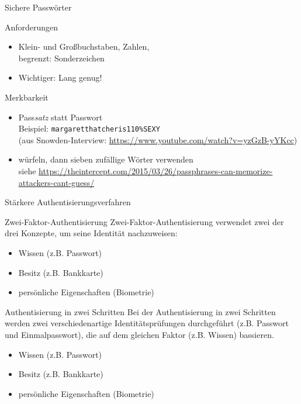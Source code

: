 \begin{frame}{Sichere Passwörter}
  \begin{block}{Anforderungen}
  \begin{itemize}
    \item Klein- und Großbuchstaben, Zahlen,\\ begrenzt: Sonderzeichen
    \item Wichtiger: Lang genug!
  \end{itemize}
  \end{block}
  \begin{block}{Merkbarkeit}
  \begin{itemize}
    \item Pass\emph{satz} statt Passwort\\
      Beispiel: \texttt{margaretthatcheris110\%SEXY}\\
      {\scriptsize (aus Snowden-Interview: \url{https://www.youtube.com/watch?v=yzGzB-yYKcc})}
    \item würfeln, dann sieben zufällige Wörter verwenden\\
      {\scriptsize siehe \url{https://theintercept.com/2015/03/26/passphrases-can-memorize-attackers-cant-guess/}}
  \end{itemize}
  \end{block}
\end{frame}

\begin{frame}{Stärkere Authentisierungsverfahren}
  \begin{block}{Zwei-Faktor-Authentisierung}
    Zwei-Faktor-Authentisierung verwendet zwei der drei Konzepte, um seine Identität nachzuweisen:
    \begin{itemize}
      \item Wissen (z.B. Passwort)
      \item Besitz (z.B. Bankkarte)
      \item persönliche Eigenschaften (Biometrie)
    \end{itemize}
  \end{block}
  \begin{block}{Authentisierung in zwei Schritten}
    Bei der Authentisierung in zwei Schritten werden zwei verschiedenartige Identitätsprüfungen durchgeführt (z.B. Passwort und Einmalpasswort),
    die auf dem gleichen Faktor (z.B. Wissen) bassieren.
    \begin{itemize}
      \item Wissen (z.B. Passwort)
      \item Besitz (z.B. Bankkarte)
      \item persönliche Eigenschaften (Biometrie)
    \end{itemize}
  \end{block}
\end{frame}

